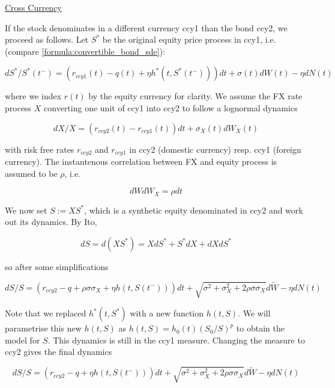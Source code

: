 {\underline{Cross Currency}

If the stock denominates in a different currency ccy1 than the bond ccy2, we proceed as follows. Let $S^*$ be the
original equity price process in ccy1, i.e. (compare \ref{formula:convertible_bond_sde}):

\begin{equation}
  dS^* / S^*(t^-) = (r_{ccy1}(t) - q(t) + \eta h^*(t, S^*(t^-))) dt + \sigma(t) dW(t) - \eta dN(t)
\end{equation}

where we index $r(t)$ by the equity currency for clarity. We assume the FX rate process $X$ converting one unit of ccy1 into
ccy2 to follow a lognormal dynamics

\begin{equation}
  dX / X = (r_{ccy2}(t) - r_{ccy1}(t)) dt + \sigma_X(t) dW_X(t)
\end{equation}

with risk free rates $r_{ccy2}$ and $r_{ccy1}$ in ccy2 (domestic currency) resp. ccy1 (foreign currency). The
instantenous correlation between FX and equity process is assumed to be $\rho$, i.e.

\begin{equation}
  dW dW_X = \rho dt
\end{equation}

 We now set $S:=XS^*$, which is a synthetic equity denominated in ccy2 and work out its dynamics. By Ito,

\begin{equation}
  dS = d(XS^*) = XdS^* + S^*dX + dXdS^*
\end{equation}

so after some simplifications

\begin{equation}
  dS / S = (r_{ccy2} - q + \rho \sigma \sigma_X + \eta h(t, S(t^-))) dt + \sqrt{\sigma^2 + \sigma_X^2 + 2
    \rho\sigma\sigma_X} d\tilde{W} - \eta dN(t)
\end{equation}

Note that we replaced $h^*(t,S^*)$ with a new function $h(t,S)$. We will parametrise this new $h(t,S)$ as
$ h(t,S) = h_0(t) (S_0/S)^p$ to obtain the model for $S$. This dynamics is still in the ccy1 measure. Changing the
measure to ccy2 gives the final dynamics

\begin{equation}\label{formula:convertible_bond_xccy_dynamics}
  dS / S = (r_{ccy2} - q + \eta h(t, S(t^-))) dt + \sqrt{\sigma^2 + \sigma_X^2 + 2\rho\sigma\sigma_X} d\tilde{W} - \eta dN(t)
\end{equation}

}
